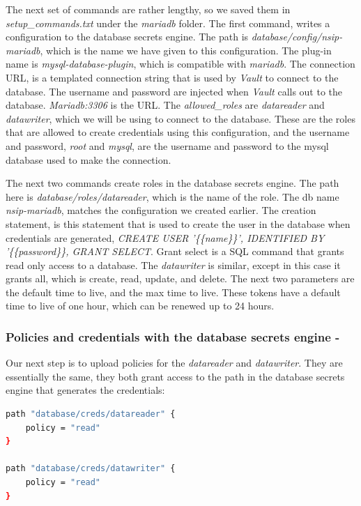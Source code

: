 \documentclass[runningheads]{llncs}
\begin{document}
The next set of commands are rather lengthy, so we saved them in \textit{setup\_\allowbreak commands.txt} under the \textit{mariadb} folder. The first command, writes a configuration to the database secrets engine. The path is \textit{database/config/nsip-mariadb}, which is the name we have given to this configuration. The plug-in name is \textit{mysql-database-plugin}, which is compatible with \textit{mariadb}. The connection URL, is a templated connection string that is used by \textit{Vault} to connect to the database. The username and password are injected when \textit{Vault} calls out to the database. \textit{Mariadb:3306} is the URL. The \textit{allowed\_roles} are \textit{datareader} and \textit{datawriter}, which we will be using to connect to the database. These are the roles that are allowed to create credentials using this configuration, and the username and password, \textit{root} and \textit{mysql}, are the username and password to the mysql database used to make the connection. 

The next two commands create roles in the database secrets engine. The path here is \textit{database/roles/datareader}, which is the name of the role. The db name \textit{nsip-mariadb}, matches the configuration we created earlier. The creation statement, is this statement that is used to create the user in the database when credentials are generated, \textit{CREATE USER '\{\{name\}\}', IDENTIFIED BY '\{\{password\}\}, GRANT SELECT}. Grant select is a SQL command that grants read only access to a database. The \textit{datawriter} is similar, except in this case it grants all, which is create, read, update, and delete. The next two parameters are the default time to live, and the max time to live. These tokens have a default time to live of one hour, which can be renewed up to 24 hours.

\subsubsection{Policies and credentials with the database secrets engine -} Our next step is to upload policies for the \textit{datareader} and \textit{datawriter}. They are essentially the same, they both grant access to the path in the database secrets engine that generates the credentials:

\begin{lstlisting}[language=bash]
path "database/creds/datareader" {
    policy = "read"
}

path "database/creds/datawriter" {
    policy = "read"
}
\end{lstlisting}
\end{document}
